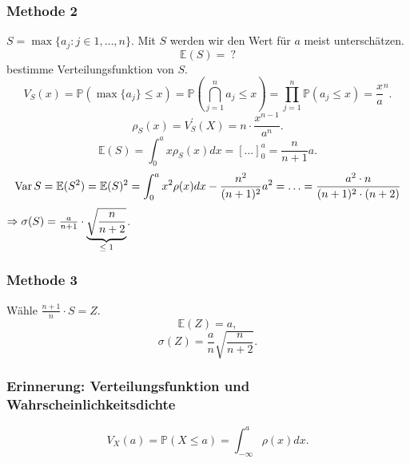 \subsubsection{Methode 2}
$S=\max\{a_j\colon j\in1,\ldots,n\}$. Mit $S$ werden wir den Wert f\"ur $a$ meist untersch\"atzen.
\[
\mathbb{E}(S)=\ ?
\]
bestimme Verteilungsfunktion von $S$.
\[
V_S(x)=\mathbb{P}(\max\{a_j\}\leq x)=\mathbb{P}(\bigcap_{j=1}^n a_j\leq x)=\prod_{j=1}^n\mathbb{P}(a_j\leq x)=\frac{x}{a}^n.
\]
\[
\rho_S(x)=V_S^\prime(X)=n\cdot\frac{x^{n-1}}{a^n}.
\]
\[
\mathbb{E}(S)=\int_0^ax\rho_S(x)dx=[\ldots]_0^a=\frac{n}{n+1}a.
\]
\[
\operatorname{Var} S=\mathbb{E}(S^2)=\mathbb{E}(S)^2=\int_0^ax^2\rho(x)dx-\frac{n^2}{(n+1)^2}a^2=\ldots=\frac{a^2\cdot n}{(n+1)^2\cdot(n+2)}
\]
$\Rightarrow\sigma(S)=\frac{a}{n+1}\cdot\ubr{\sqrt{\frac{n}{n+2}}}{$\leq 1$}$.
\subsubsection{Methode 3}
W\"ahle $\frac{n+1}{n}\cdot S=Z$.
\[
\mathbb{E}(Z)=a,
\]
\[
\sigma(Z)=\frac{a}{n}\sqrt{\frac{n}{n+2}}.
\]
\subsubsection{Erinnerung: Verteilungsfunktion und Wahrscheinlichkeitsdichte}
\[
V_X(a)=\mathbb{P}(X\leq a)=\int_{-\infty}^a\rho(x)dx.
\]


